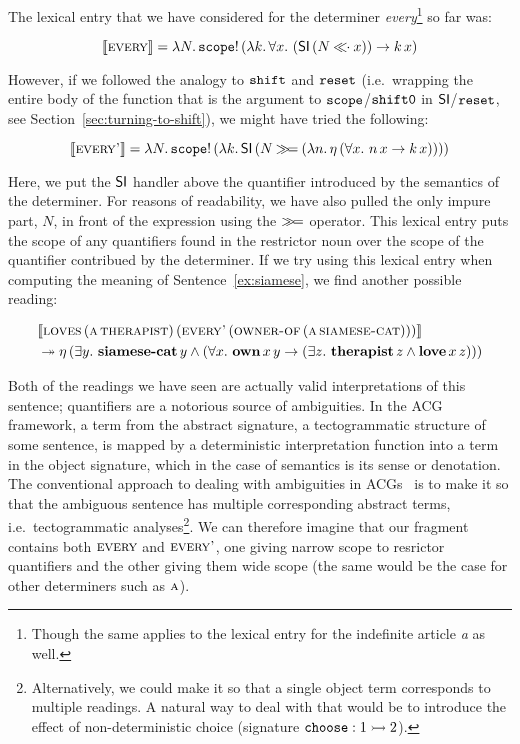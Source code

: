 The lexical entry that we have considered for the determiner
\emph{every}\footnote{Though the same applies to the lexical entry for the
  indefinite article \emph{a} as well.} so far was:

$$
\llbracket \textsc{every} \rrbracket = \lambda N.\, \mathtt{scope}!\,(\lambda k.\, \forall x.\
      (\textsf{SI}\,(N \mathbin{\ll\!\!\cdot} x)) \to k\,x)
$$

However, if we followed the analogy to $\mathtt{shift}$ and $\mathtt{reset}$ (i.e.\
wrapping the entire body of the function that is the argument to
$\mathtt{scope}$/$\mathtt{shift0}$ in $\textsf{SI}$/$\mathtt{reset}$, see
Section~\ref{sec:turning-to-shift}), we might have tried the following:

$$
\llbracket \textsc{every'} \rrbracket = \lambda N.\, \mathtt{scope}!\,(\lambda k.\, \textsf{SI}\,(N \mathbin{\gg\!=}
        (\lambda n.\, \eta\,(\forall x.\ n\,x \to k\,x))))
$$

Here, we put the $\textsf{SI}$ handler above the quantifier introduced by the
semantics of the determiner. For reasons of readability, we have also
pulled the only impure part, $N$, in front of the expression using the
$\mathbin{\gg\!=}$ operator. This lexical entry puts the scope of any quantifiers
found in the restrictor noun over the scope of the quantifier contribued by
the determiner. If we try using this lexical entry when computing the
meaning of Sentence~\ref{ex:siamese}, we find another possible reading:

\addtocounter{equation}{-1}
\NoChapterPrefix
\begin{align}
& \llbracket \textsc{loves}\,(\textsc{a}\,\textsc{therapist})\,(\textsc{every'}\,(\textsc{owner-of}\,(\textsc{a}\,\textsc{siamese-cat}))) \rrbracket \nonumber \\
&\twoheadrightarrow \eta\,(\exists y.\ \textbf{siamese-cat}\,y \land (\forall x.\ \textbf{own}\,x\,y \to (\exists z.\ \textbf{therapist}\,z \land \textbf{love}\,x\,z)))
\end{align}
\ChapterPrefix

Both of the readings we have seen are actually valid interpretations of
this sentence; quantifiers are a notorious source of ambiguities. In the
ACG framework, a term from the abstract signature, a tectogrammatic
structure of some sentence, is mapped by a deterministic interpretation
function into a term in the object signature, which in the case of
semantics is its sense or denotation. The conventional approach to dealing
with ambiguities in ACGs~\cite{de2001towards,pogodalla2007generalizing} is
to make it so that the ambiguous sentence has multiple corresponding
abstract terms, i.e.\ tectogrammatic analyses\footnote{Alternatively, we
  could make it so that a single object term corresponds to multiple
  readings. A natural way to deal with that would be to introduce the
  effect of non-deterministic choice (signature $\mathtt{choose} : 1 \rightarrowtail 2$).
}. We can therefore imagine that our fragment contains both $\textsc{every}$
and $\textsc{every'}$, one giving narrow scope to resrictor quantifiers and
the other giving them wide scope (the same would be the case for other
determiners such as $\textsc{a}$).

